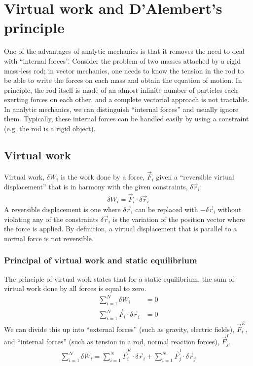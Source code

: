 %
\chapter{Virtual work and D'Alembert's principle}
One of the advantages of analytic mechanics is that it removes the need to deal with ``internal forces''. Consider the problem of two masses attached by a rigid mass-less rod; in vector mechanics, one needs to know the tension in the rod to be able to write the forces on each mass and obtain the equation of motion. In principle, the rod itself is made of an almost infinite number of particles each exerting forces on each other, and a complete vectorial approach is not tractable. In analytic mechanics, we can distinguish ``internal forces'' and usually ignore them. Typically, these internal forces can be handled easily by using a constraint (e.g. the rod is a rigid object).

\section{Virtual work}
Virtual work, $\delta W_i$ is the work done by a force, $\vec{F}_i$ given a ``reversible virtual displacement'' that is in harmony with the given constraints, $\delta\vec{r}_i$:
\begin{align}
\delta W_i = \vec{F}_i\cdot\delta\vec{r}_i
\end{align}
A reversible displacement is one where $\delta\vec{r}_i$ can be replaced with $-\delta\vec{r}_i$ without violating any of the constraints $\delta\vec{r}_i$ is the variation of the position vector where the force is applied.  By definition, a virtual displacement that is parallel to a normal force is not reversible.

\subsection{Principal of virtual work and static equilibrium}
The principle of virtual work states that for a static equilibrium, the sum of virtual work done by all forces is equal to zero.
\begin{align}
\sum_{i=1}^N\delta W_i &= 0 \nonumber\\
\sum_{i=1}^N\vec{F}_i\cdot\delta\vec{r}_i &= 0
\end{align}
We can divide this up into ``external forces'' (such as gravity, electric fields), $\vec{F}^E_i$, and ``internal forces'' (such as tension in a rod, normal reaction forces), $\vec{F}^I_j$.
\begin{align}
\sum_{i=1}^N\delta W_i=\sum_{i=1}^N \vec{F}^E_i\cdot\delta\vec{r}_i + \sum_{i=1}^N\vec{F}^I_j\cdot\delta\vec{r}_j
\end{align}

